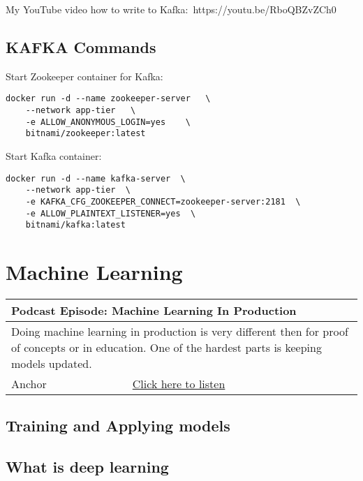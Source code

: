 \documentclass[12pt, numbers=noenddot]{scrreprt} %
\begin{document}
My YouTube video how to write to Kafka: https://youtu.be/RboQBZvZCh0

\section{KAFKA Commands}

Start Zookeeper container for Kafka:

\begin{lstlisting}
docker run -d --name zookeeper-server   \
	--network app-tier   \
	-e ALLOW_ANONYMOUS_LOGIN=yes    \
	bitnami/zookeeper:latest
\end{lstlisting}

Start Kafka container:

\begin{lstlisting}
docker run -d --name kafka-server  \
	--network app-tier  \
	-e KAFKA_CFG_ZOOKEEPER_CONNECT=zookeeper-server:2181  \
	-e ALLOW_PLAINTEXT_LISTENER=yes  \
	bitnami/kafka:latest
\end{lstlisting}


\chapter{Machine Learning}

\begin{table}[h]
\begin{tabular}{ll}
\hline
\multicolumn{2}{l}{\textbf{Podcast Episode:} Machine Learning In Production} \\ \hline
\multicolumn{2}{p{15cm}}{Doing machine learning in production is very different then for proof of concepts or in education. One of the hardest parts is keeping models updated.}         \\ \hline
\multicolumn{1}{l|}{Anchor}   & \href{https://anchor.fm/andreaskayy/episodes/Machine-Learning-In-Production-e11bbk}{Click here to listen}   \\  \hline
\end{tabular}
\end{table}


\section{Training and Applying models}
\section{What is deep learning}
\end{document}
